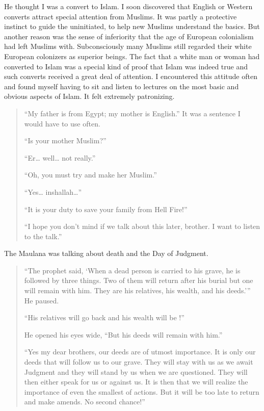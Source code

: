 \documentclass[12pt]{memoir}
\begin{document}
He thought I was a convert to Islam.
I soon discovered that English or Western converts
attract special attention from Muslims.
It was partly a protective instinct to guide the uninitiated,
to help new Muslims understand the basics.
But another reason was the sense of inferiority
that the age of European colonialism had left Muslims with.
Subconsciously many Muslims still regarded
their white European colonizers as superior beings.
The fact that a white man or woman had converted to Islam
was a special kind of proof that Islam was indeed true
and such converts received a great deal of attention.
I encountered this attitude often and found myself having to sit
and listen to lectures on the most basic and obvious aspects of Islam.
It felt extremely patronizing.

\begin{quote}
“My father is from Egypt; my mother is English.”
It was a sentence I would have to use often.

“Is your mother Muslim?”

“Er… well… not really.”

“Oh, you must try and make her Muslim.”

“Yes… inshallah…”

“It is your duty to save your family from Hell Fire!”

“I hope you don’t mind if we talk about this later, brother.
I want to listen to the talk.”
\end{quote}

The Maulana was talking about death and the Day of Judgment.

\begin{quote}
“The prophet said,
‘When a dead person is carried to his grave,
he is followed by three things.
Two of them will return after his burial but one will remain with him.
They are his relatives, his wealth, and his deeds.’”
He paused.

“His relatives will go back
and his wealth will be !”

He opened his eyes wide, “But his deeds will remain with him.”

“Yes my dear brothers, our deeds are of utmost importance.
It is only our deeds that will follow us to our grave.
They will stay with us as we await Judgment
and they will stand by us when we are questioned.
They will then either speak for us or against us.
It is then that we will realize the importance of even the smallest of actions.
But it will be too late to return and make amends.
No second chance!”
\end{quote}
\end{document}

